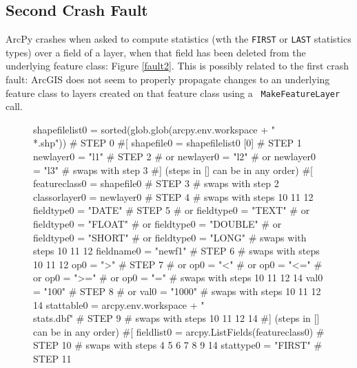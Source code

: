 \subsection{Second Crash Fault}

ArcPy crashes when asked to compute statistics (wth the {\tt FIRST} or
{\tt LAST} statistics types) over a field of a layer, when that field
has been deleted from the underlying feature class:  Figure
\ref{fault2}.  This is possibly related to the first crash fault:
ArcGIS does not seem to properly propagate changes to an underlying
feature class to layers created on that feature class using a {\tt
  MakeFeatureLayer} call.

\begin{figure}
{\scriptsize 
\begin{code}
shapefilelist0 = sorted(glob.glob(arcpy.env.workspace + "\\*.shp"))                   \# STEP 0
\#[
shapefile0 = shapefilelist0 [0]                                                      \# STEP 1
newlayer0 = "l1"                                                                     \# STEP 2
\#  or newlayer0 = "l2" 
\#  or newlayer0 = "l3" 
\#  swaps with step 3
\#] (steps in [] can be in any order)
\#[
featureclass0 = shapefile0                                                           \# STEP 3
\#  swaps with step 2
classorlayer0 = newlayer0                                                            \# STEP 4
\#  swaps with steps 10 11 12
fieldtype0 = "DATE"                                                                  \# STEP 5
\#  or fieldtype0 = "TEXT" 
\#  or fieldtype0 = "FLOAT" 
\#  or fieldtype0 = "DOUBLE" 
\#  or fieldtype0 = "SHORT" 
\#  or fieldtype0 = "LONG" 
\#  swaps with steps 10 11 12
fieldname0 = "newf1"                                                                 \# STEP 6
\#  swaps with steps 10 11 12
op0 = ">"                                                                            \# STEP 7
\#  or op0 = "<" 
\#  or op0 = "<=" 
\#  or op0 = ">=" 
\#  or op0 = "=" 
\#  swaps with steps 10 11 12 14
val0 = "100"                                                                         \# STEP 8
\#  or val0 = "1000" 
\#  swaps with steps 10 11 12 14
stattable0 = arcpy.env.workspace + "\\stats.dbf"                                      \# STEP 9
\#  swaps with steps 10 11 12 14
\#] (steps in [] can be in any order)
\#[
fieldlist0 = arcpy.ListFields(featureclass0)                                         \# STEP 10
\#  swaps with steps 4 5 6 7 8 9 14
stattype0 = "FIRST"                                                                  \# STEP 11

\end{code}}
\end{figure}

